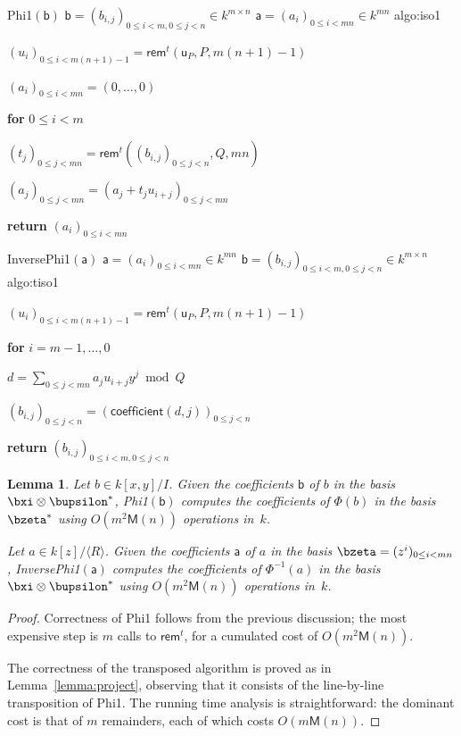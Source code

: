 \documentclass{sig-alternate}
\def\M {\ensuremath{\mathsf{M}}}
\def\va {\ensuremath{\mathsf{a}}}
\def\vu {\ensuremath{\mathsf{u}}}
\def\vb {\ensuremath{\mathsf{b}}}
\def\rem {\ensuremath{\mathsf{rem}}}
\def\coeff {\ensuremath{\mathsf{coefficient}}}
\newcounter{algo}
\newenvironment{algorithm_noendline}[4]{\small\begin{center}\begin{minipage}{0.48\textwidth}
      \refstepcounter{algo}
      \label{#4}
      \sf
      \rule{\textwidth}{0.2pt}\\
      \makebox[\textwidth][c]{Algorithm~\arabic{algo}:~\textbf{#1}}\\
      \rule[0.5\baselineskip]{\textwidth}{0.2pt}\\

      \vspace{-12pt}

      \parbox{\textwidth}{\textbf{Input} #2}
      \parbox{\textwidth}{\textbf{Output} #3}

\vspace{-7pt}

      \begin{enumerate*}}{\end{enumerate*}
      \vspace{-11pt}
\end{minipage}\end{center}
}
\newenvironment{algorithm_endline}[4]{\small\begin{center}\begin{minipage}{0.48\textwidth}
      \refstepcounter{algo}
      \label{#4}
      \sf
      \rule{\textwidth}{0.2pt}\\
      \makebox[\textwidth][c]{Algorithm~\arabic{algo}:~\textbf{#1}}\\
      \rule[0.5\baselineskip]{\textwidth}{0.2pt}\\

      \vspace{-12pt}

      \parbox{\textwidth}{\textbf{Input} #2}
      \parbox{\textwidth}{\textbf{Output} #3}

\vspace{-7pt}

      \begin{enumerate*}}{\end{enumerate*}
      \vspace{-11pt}
      \rule{\textwidth}{0.2pt}
\end{minipage}\end{center}
}
\newcommand{\ang}[1]{\langle#1\rangle}
\newtheorem{Lemma}{Lemma}
\begin{document}
\begin{algofloat}[t]
  \begin{algorithm_noendline}
{Phi1$(\vb)$}
{$\vb = (b_{i,j})_{0 \le i < m, 0 \le j < n} \in k^{m \times n}$}
{$\va = (a_{i})_{0 \le i < mn} \in k^{m n}$}
{algo:iso1}
\item $(u_i)_{0\le i < m(n+1)-1} = \rem^t(\vu_P,P,m(n+1)-1)$
\item  $(a_i)_{0\le i < mn} = (0,\dots,0)$
\item {\bf for} {$0\le i < m$}
\item \hspace{7mm} $(t_j)_{0\le j < mn} = \rem^t( (b_{i,j})_{0 \le j <n},Q,mn)$
\item \hspace{7mm} $(a_j)_{0\le j < mn} = (a_j + t_ju_{i+j})_{0\le j < mn}$
\item {\bf return} $(a_i)_{0\le i <mn}$
  \end{algorithm_noendline}
\begin{algorithm_endline}
{InversePhi1$(\va)$}
{$\va = (a_{i})_{0 \le i < mn} \in k^{m n}$}
{$\vb = (b_{i,j})_{0 \le i < m, 0 \le j < n} \in k^{m \times n}$}
{algo:tiso1}
\item $(u_i)_{0\le i < m(n+1)-1} = \rem^t(\vu_P,P,m(n+1)-1)$
\item {\bf for} {$i = m-1,\dots,0$}
\item \hspace{7mm} $d=\sum_{0 \le j < mn} a_j u_{i+j} y^j \bmod Q$
\item \hspace{7mm}  $(b_{i,j})_{0 \le j < n} = (\coeff(d,j))_{0 \le j < n}$
\item {\bf return} $(b_{i,j})_{0 \le i < m, 0 \le j < n}$
\end{algorithm_endline}
\vspace{-4ex}
\end{algofloat}

\begin{Lemma}
  Let $b \in k[x,y]/I$. Given the coefficients $\vb$ of $b$ in the
  basis $\bxi \otimes \bupsilon^\ast$, {\sf Phi1}$(\vb)$ computes the
  coefficients of $\Phi(b)$ in the basis $\bzeta^\ast$ using
  $O(m^2\M(n))$ operations in~$k$.

   Let $a\in k[z]/\ang{R}$. Given the coefficients $\va$ of $a$ in the
  basis $\bzeta=(z^i)_{0 \le i < mn}$, {\sf InversePhi1}$(\va)$
  computes the coefficients of $\Phi^{-1}(a)$ in the basis $\bxi
  \otimes \bupsilon^\ast$ using $O(m^2\M(n))$ operations in~$k$.
\end{Lemma}
\begin{proof}
  Correctness of {\sf Phi1} follows from the previous discussion; the
  most expensive step is $m$ calls to $\rem^t$, for a cumulated cost
  of $O(m^2\M(n))$.

  The correctness of the transposed algorithm is proved as in
  Lemma~\ref{lemma:project}, observing that it consists of the
  line-by-line transposition of {\sf Phi1}. The running time analysis
  is straightforward: the dominant cost is that of $m$ remainders,
  each of which costs $O(m\M(n))$.
\end{proof}
\end{document}
